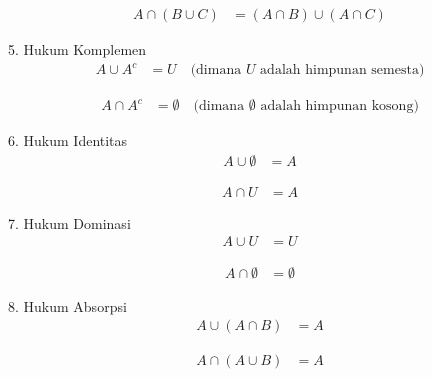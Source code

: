 \documentclass{article}
\begin{document}
\begin{align*}
A \cap (B \cup C) &= (A \cap B) \cup (A \cap C)
\end{align*}
\begin{figure}[H]
    \centering
\end{figure} 

5. Hukum Komplemen
\begin{align*}
A \cup A^c &= U \quad \text{(dimana } U \text{ adalah himpunan semesta)} 
\end{align*}


\begin{figure}[H]
    \centering
\end{figure} 

\begin{align*}
A \cap A^c &= \emptyset \quad \text{(dimana } \emptyset \text{ adalah himpunan kosong)}
\end{align*}
    
\begin{figure}[H]
    \centering
\end{figure} 

6. Hukum Identitas
\begin{align*}
A \cup \emptyset &= A 
\end{align*}

\begin{figure}[H]
    \centering
\end{figure} 

\begin{align*}
A \cap U &= A
\end{align*}

\begin{figure}[H]
    \centering
\end{figure} 

7. Hukum Dominasi
\begin{align*}
A \cup U &= U 
\end{align*}
\begin{figure}[H]
    \centering
\end{figure} 
\begin{align*}
A \cap \emptyset &= \emptyset
\end{align*}
\begin{figure}[H]
    \centering
\end{figure} 

8. Hukum Absorpsi
\begin{align*}
A \cup (A \cap B) &= A 
\end{align*}
\begin{figure}[H]
    \centering
\end{figure} 
\begin{align*}
A \cap (A \cup B) &= A
\end{align*}
\begin{figure}[H]
    \centering
\end{figure} 
\end{document}
